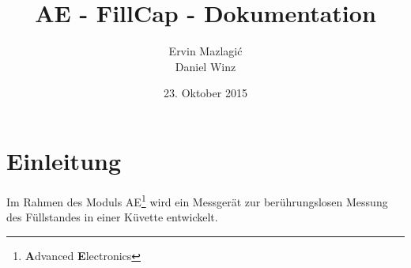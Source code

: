 \documentclass[a4,paper,fleqn]{article}
\title{AE - FillCap - Dokumentation}
\date{23. Oktober 2015}
\author{Ervin Mazlagi\'c\\
        Daniel Winz}
\begin{document}
\maketitle
\clearpage
\tableofcontents
\clearpage

\section{Einleitung}
Im Rahmen des Moduls AE\footnote{\textbf{A}dvanced \textbf{E}lectronics} wird 
ein Messgerät zur berührungslosen Messung des Füllstandes in einer Küvette 
entwickelt. 
\end{document}
